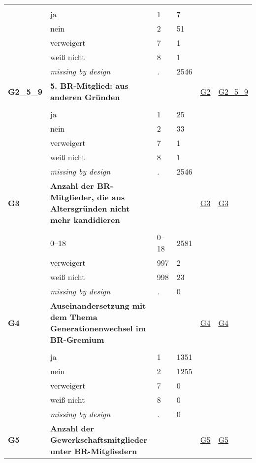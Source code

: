 \begin{longtable}{| L{2.45cm} | L{6cm} | C{1.5cm} | R{1cm} | C{2.25cm} | C{2.25cm} |}
   &  &  &  &  &  \\ 
   & ja & 1 & 7 &  &  \\ 
   & nein & 2 & 51 &  &  \\ 
   & verweigert & 7 & 1 &  &  \\ 
   & weiß nicht & 8 & 1 &  &  \\ 
   & \textit{missing by design} & \textit{.} & 2546 &  &  \\ 
   \midrule
\textbf{G2\_5\_9}\label{var:G2:5:9} & \textbf{5. BR-Mitglied: aus anderen Gründen} &  &  & \hyperref[G2]{G2} & \hyperref[var:suf:G2:5:9]{G2\_5\_9} \\ 
   &  &  &  &  &  \\ 
   & ja & 1 & 25 &  &  \\ 
   & nein & 2 & 33 &  &  \\ 
   & verweigert & 7 & 1 &  &  \\ 
   & weiß nicht & 8 & 1 &  &  \\ 
   & \textit{missing by design} & \textit{.} & 2546 &  &  \\ 
   \midrule
\textbf{G3}\label{var:G3} & \textbf{Anzahl der BR-Mitglieder, die aus Altersgründen nicht mehr kandidieren} &  &  & \hyperref[G3]{G3} & \hyperref[var:suf:G3]{G3} \\ 
   &  &  &  &  &  \\ 
   & 0--18 & 0--18 & 2581 &  &  \\ 
   & verweigert & 997 & 2 &  &  \\ 
   & weiß nicht & 998 & 23 &  &  \\ 
   & \textit{missing by design} & \textit{.} & 0 &  &  \\ 
   \midrule
\textbf{G4}\label{var:G4} & \textbf{Auseinandersetzung mit dem Thema Generationenwechsel im BR-Gremium} &  &  & \hyperref[G4]{G4} & \hyperref[var:suf:G4]{G4} \\ 
   &  &  &  &  &  \\ 
   & ja & 1 & 1351 &  &  \\ 
   & nein & 2 & 1255 &  &  \\ 
   & verweigert & 7 & 0 &  &  \\ 
   & weiß nicht & 8 & 0 &  &  \\ 
   & \textit{missing by design} & \textit{.} & 0 &  &  \\ 
   \midrule
\textbf{G5}\label{var:G5} & \textbf{Anzahl der Gewerkschaftsmitglieder unter BR-Mitgliedern} &  &  & \hyperref[G5]{G5} & \hyperref[var:suf:G5]{G5} \\ 

\end{longtable}
